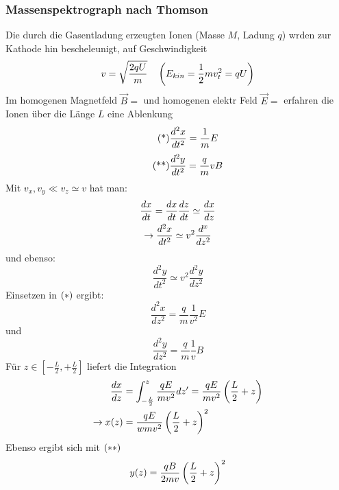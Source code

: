 \subsubsection{Massenspektrograph nach Thomson} %
\label{ssub:Massenspektrograph_nach_Thomson}
Die durch die Gasentladung erzeugten Ionen (Masse $M$, Ladung $q$) wrden zur
Kathode hin bescheleunigt, auf Geschwindigkeit 
\begin{equation*}
    v=\sqrt{\frac{2qU}{m}} \quad \left( E_{kin} = \frac{1}{2} m v_t^2 = qU \right) 
\end{equation*}
Im homogenen Magnetfeld $\vec{B}=$ %
und homogenen elektr Feld $\vec{E}=$ %
erfahren die Ionen über die Länge $L$ eine Ablenkung    
\begin{equation*}
    \label{eqn:massenspek1}
    \tag*{\text{(*)}}
    \frac{d ^2 x}{d t^2} = \frac{1}{m}E
\end{equation*}
\begin{equation*}
    \label{eqn:massenspek2}
    \tag*{\text{(**)}}
    \frac{d ^2y}{d t^2}=\frac{q}{m} v B
\end{equation*}
Mit $v_x,v_y \ll v_z \simeq v$ hat man:
\begin{gather*}
    \frac{dx}{dt} = \frac{d x}{d t} \frac{d z}{d t} \simeq \frac{d x}{d z} \\
    \rightarrow \frac{d ^2x}{d t^2} \simeq v^2 \frac{d ^x}{d z^2}
\end{gather*}
und ebenso:
\begin{equation*}
    \frac{d ^2y}{d t^2} \simeq v^2 \frac{d ^2y}{d z^2}
\end{equation*}
Einsetzen in $\left( * \right)$ ergibt:
\begin{equation*}
    \frac{d ^2 x}{d z^2} =\frac{q}{m} \frac{1}{v^2}E
\end{equation*}
und
\begin{equation*}
    \frac{d ^2y}{d z^2} = \frac{q}{m}\frac{1}{v}B
\end{equation*}
Für $z \in \left[ -\frac{L}{2}, + \frac{L}{2} \right]$ liefert die Integration
\begin{align*}
    \frac{d x}{d z} &= \int_{-\frac{L}{2}}^{z} \frac{qE}{mv^2}dz' =
    \frac{qE}{mv^2} \left( \frac{L}{2} +z \right)  \\
    \rightarrow x(z) &= \frac{qE}{wmv^2}\left( \frac{L}{2} +z \right)^2
\end{align*}
Ebenso ergibt sich mit $\left( ** \right)$
\begin{equation*}
    y(z) = \frac{qB}{2mv} \left( \frac{L}{2} + z \right)^2
\end{equation*}
